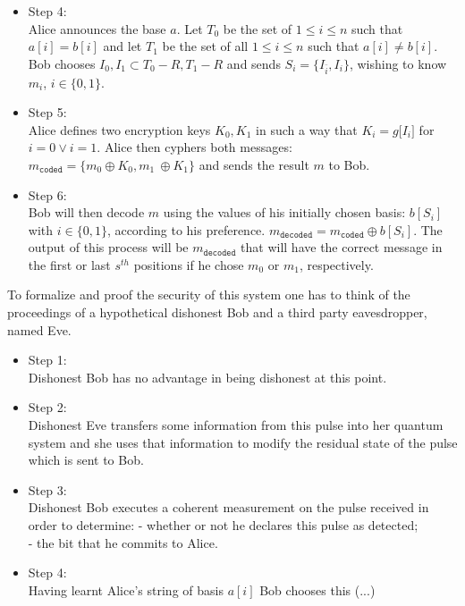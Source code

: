 \begin{refsection}
\begin{itemize}
 	\item Step 4:\\
 	Alice announces the base $a$. Let $T_0$ be the set of $1\leq i \leq n$ such that $a\left[i\right]=b\left[i\right]$ and let $T_1$ be the set of all $1\leq i \leq n$ such that $a\left[i\right]\ne b\left[i\right]$. Bob chooses $I_0,I_1\subset T_0-R, T_1-R$ and sends $S_i=\{I_\bar{i},I_i\}$, wishing to know $m_i$, $i\in\{0,1\}$.
 	\item Step 5:\\
 	Alice defines two encryption keys $K_0,K_1$ in such a way that $K_i=g\big[I_i\big]$ for $i=0 \vee i=1$. Alice then cyphers both messages: $m_{\mathtt{coded}}=\{m_0\oplus K_0,m_1\ \oplus K_1\}$ and sends the result $m$ to Bob.
 	\item Step 6:\\
 	Bob will then decode $m$ using the values of his initially chosen basis:  $b\left[S_i\right]$ with $i\in\{0,1\}$, according to his preference. $m_{\mathtt{decoded}}=m_{\mathtt{coded}}\oplus b\left[S_i\right]$. The output of this process will be $m_{\mathtt{decoded}}$ that will have the correct message in the first or last $s^{th}$ positions if he chose $m_0$ or $m_1$, respectively.
 \end{itemize}
To formalize and proof the security of this system one has to think of the proceedings of a hypothetical dishonest Bob and a third party eavesdropper, named Eve.
\begin{itemize}
\item Step 1:\\
Dishonest Bob has no advantage in being dishonest at this point.
\item Step 2:\\
Dishonest Eve transfers some information from this pulse into her quantum system and she uses that information to modify the residual state of the pulse which is sent to Bob.
\item Step 3:\\
Dishonest Bob executes a coherent measurement on the pulse received in order to determine:
- whether or not he declares this pulse as detected;\\
- the bit that he commits to Alice.
\item Step 4:\\
Having learnt Alice's string of basis $a\left[i\right]$ Bob chooses this (...)
\end{itemize}

\clearpage
\printbibliography[heading=subbibliography]
\end{refsection}
\cleardoublepage
